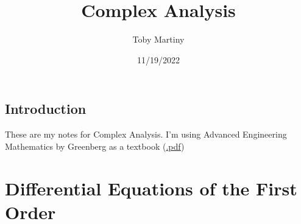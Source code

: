 \documentclass{report}
\title{\Huge{Complex Analysis}}
\author{\huge{Toby Martiny}}
\date{11/19/2022}
\begin{document}
\maketitle
\newpage%
\tableofcontents
\pagebreak



\section{Introduction}
    These are my notes for Complex Analysis. I'm using Advanced Engineering Mathematics by Greenberg as a textbook (\href{https://library.uoh.edu.iq/admin/ebooks/34632-greenberg---advanced-engineering-mathematics-(1999).pdf}{.pdf})

\setcounter{chapter}{1}
\chapter{Differential Equations of the First Order}
    \setcounter{section}{4}
\end{document}
